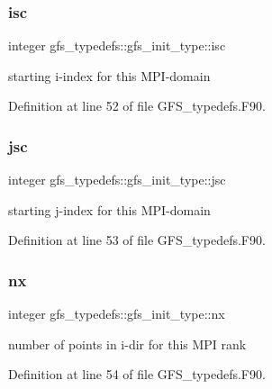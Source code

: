 \subsubsection{isc}
{\footnotesize\ttfamily integer gfs\+\_\+typedefs\+::gfs\+\_\+init\+\_\+type\+::isc}



starting i-\/index for this M\+P\+I-\/domain 



Definition at line 52 of file G\+F\+S\+\_\+typedefs.\+F90.

\mbox{\label{structgfs__typedefs_1_1gfs__init__type_af98085b9e9e94f258b2a4d141533def7}} 
\subsubsection{jsc}
{\footnotesize\ttfamily integer gfs\+\_\+typedefs\+::gfs\+\_\+init\+\_\+type\+::jsc}



starting j-\/index for this M\+P\+I-\/domain 



Definition at line 53 of file G\+F\+S\+\_\+typedefs.\+F90.

\mbox{\label{structgfs__typedefs_1_1gfs__init__type_aca3dd8add3fe4c767b02252e22445f24}} 
\subsubsection{nx}
{\footnotesize\ttfamily integer gfs\+\_\+typedefs\+::gfs\+\_\+init\+\_\+type\+::nx}



number of points in i-\/dir for this M\+PI rank 



Definition at line 54 of file G\+F\+S\+\_\+typedefs.\+F90.

\mbox{\label{structgfs__typedefs_1_1gfs__init__type_a11eea62e0169348fbe573c4441ab7665}} 
